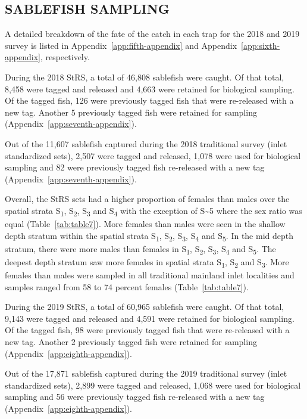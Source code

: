 \documentclass[12pt]{article}\usepackage[]{graphicx}\usepackage[]{color}
\begin{document}
\hypertarget{sablefish-sampling}{%
\subsection{SABLEFISH SAMPLING}\label{sablefish-sampling}}

A detailed breakdown of the fate of the catch in each trap for the 2018 and 2019 survey is listed in Appendix~\ref{app:fifth-appendix} and Appendix~\ref{app:sixth-appendix}, respectively.

During the 2018 StRS, a total of 46,808 sablefish were caught. Of that total, 8,458 were tagged and released and 4,663 were retained for biological sampling. Of the tagged fish, 126 were previously tagged fish that were re-released with a new tag. Another 5 previously tagged fish were retained for sampling (Appendix~\ref{app:seventh-appendix}).

Out of the 11,607 sablefish captured during the 2018 traditional survey (inlet standardized sets), 2,507 were tagged and released, 1,078 were used for biological sampling and 82 were previously tagged fish re-released with a new tag (Appendix~\ref{app:seventh-appendix}).

Overall, the StRS sets had a higher proportion of females than males over the spatial strata S\textsubscript{1}, S\textsubscript{2}, S\textsubscript{3} and S\textsubscript{4} with the exception of S\textasciitilde5 where the sex ratio was equal (Table~\ref{tab:table7}). More females than males were seen in the shallow depth stratum within the spatial strata S\textsubscript{1}, S\textsubscript{2}, S\textsubscript{3}, S\textsubscript{4} and S\textsubscript{5}. In the mid depth stratum, there were more males than females in S\textsubscript{1}, S\textsubscript{2}, S\textsubscript{3}, S\textsubscript{4} and S\textsubscript{5}. The deepest depth stratum saw more females in spatial strata S\textsubscript{1}, S\textsubscript{2} and S\textsubscript{3}. More females than males were sampled in all traditional mainland inlet localities and samples ranged from 58 to 74 percent females (Table~\ref{tab:table7}).

During the 2019 StRS, a total of 60,965 sablefish were caught. Of that total, 9,143 were tagged and released and 4,591 were retained for biological sampling. Of the tagged fish, 98 were previously tagged fish that were re-released with a new tag. Another 2 previously tagged fish were retained for sampling (Appendix~\ref{app:eighth-appendix}).

Out of the 17,871 sablefish captured during the 2019 traditional survey (inlet standardized sets), 2,899 were tagged and released, 1,068 were used for biological sampling and 56 were previously tagged fish re-released with a new tag (Appendix~\ref{app:eighth-appendix}).
\end{document}

